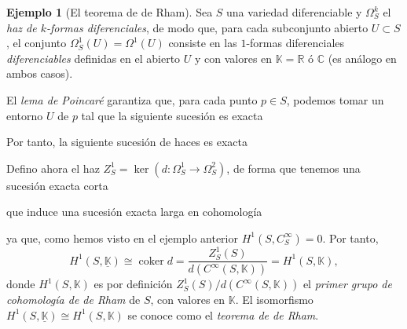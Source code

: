 \documentclass[12pt,a4paper]{article}
\theoremstyle{definition} \newtheorem{defn}[thm]{Definición}
\theoremstyle{definition} \newtheorem{ejemplo}[thm]{Ejemplo}
\theoremstyle{definition} \newtheorem{ejercicio}[thm]{Ejercicio}
\def\CC{\mathbb{C}}
\DeclareMathOperator{\coker}{coker}
\begin{document}
\begin{ejemplo}[El teorema de de Rham]
  Sea $S$ una variedad diferenciable y $\Omega^k_S$ el \emph{haz de $k$-formas diferenciales}, de modo que, para cada subconjunto abierto $U\subset S$, el conjunto $\Omega^1_S(U)=\Omega^1(U)$ consiste en las $1$-formas diferenciales \emph{diferenciables} definidas en el abierto $U$ y con valores en $\mathbb{K}=\mathbb{R}$ ó $\CC$ (es análogo en ambos casos). 

  El \emph{lema de Poincaré} garantiza que, para cada punto $p\in S$, podemos tomar un entorno $U$ de $p$ tal que la siguiente sucesión es exacta
  \begin{center}
  \end{center}
  Por tanto, la siguiente sucesión de haces es exacta
  \begin{center}
  \end{center}
  Defino ahora el haz $Z^1_S=\ker(d:\Omega^1_S \rightarrow \Omega^2_S)$, de forma que tenemos una sucesión exacta corta
  \begin{center}
 \end{center}
 que induce una sucesión exacta larga en cohomología
 \begin{center}
 \end{center}
 ya que, como hemos visto en el ejemplo anterior $H^1(S,C^\infty_S) =0$. Por tanto,
 \begin{equation*}
   H^1(S,\underline{\mathbb{K}})\cong \coker d = \frac{Z^1_S(S)}{d(C^\infty(S,\mathbb{K}))} = H^1(S,\mathbb{K}),
 \end{equation*}
 donde $H^1(S,\mathbb{K})$ es por definición $Z^1_S(S)/d(C^\infty(S,\mathbb{K}))$ el \emph{primer grupo de cohomología de de Rham} de $S$, con valores en $\mathbb{K}$. El isomorfismo $H^1(S,\underline{\mathbb{K}}) \cong H^1(S,\mathbb{K})$ se conoce como el \emph{teorema de de Rham}.
\end{ejemplo}
\end{document}
